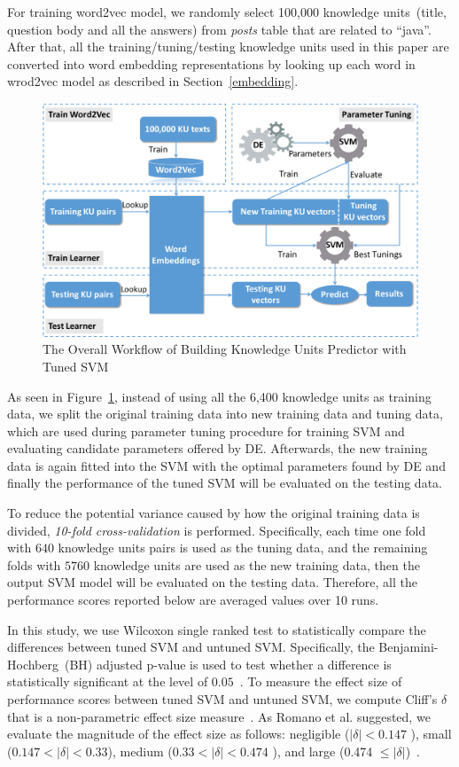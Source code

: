 \documentclass[sigconf]{acmart}
\theoremstyle{break}
\newcommand{\fig}[1]{Figure~\ref{fig:#1}}
\begin{document}
For training word2vec model, we randomly select 100,000 knowledge
 units~(title, question body and all the answers) from {\it posts} table that are
 related to ``java''. After that, all the training/tuning/testing knowledge units
 used in this paper are converted into word embedding representations by looking up
 each word in wrod2vec model as described in Section~\ref{embedding}.
 
 
 \begin{figure}
    \centering
     \includegraphics[width=.47\textwidth]{pic/workflow.pdf} %
    \caption{The Overall Workflow of Building Knowledge Units Predictor with Tuned SVM}
    \label{fig:workflow}
\end{figure}


As seen in \fig{workflow}, instead of using all the 6,400 knowledge units as training data, 
we split the original training data into { new training data} and {tuning data}, which are
used during parameter tuning procedure for training SVM and evaluating candidate
parameters offered by DE. Afterwards, the {new training} data is again fitted into the SVM
with the optimal parameters found by DE and finally  the performance of the tuned
SVM will be evaluated on the {testing data}.

To reduce the potential variance caused
by how the original training data is divided, {\it 10-fold cross-validation} is performed. Specifically, 
each time one fold with $640$ knowledge units pairs is used as the tuning data, and the remaining folds with $5760$
knowledge units are used as  the new training data, then the output SVM model will be evaluated on the testing data. Therefore,
all the performance scores reported below are averaged values over 10 runs.


In this study, we use Wilcoxon single ranked test to statistically compare
the differences between tuned SVM and untuned SVM.
Specifically, the Benjamini-Hochberg~(BH) adjusted p-value 
is used to test whether a difference is statistically significant
at the level of $0.05$~\cite{benjamini1995controlling}. 
To measure the effect size of performance scores between tuned SVM and untuned SVM,
we compute Cliff's $\delta$ that is a non-parametric effect size measure~\cite{romano2006exploring}.
As Romano et al. suggested, we evaluate the magnitude of the effect size as follows:
negligible ($|\delta|<0.147$ ), small ($ 0.147<|\delta|<0.33$), medium ($0.33<|\delta|<0.474$ ), and large (0.474 $\leq|\delta|$)~\cite{romano2006exploring}.
\end{document}
